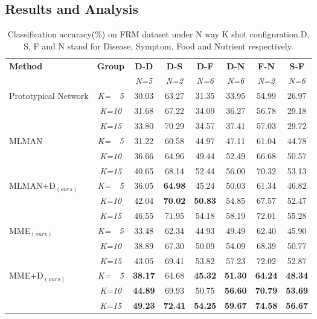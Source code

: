 \subsection{Results and Analysis}
\begin{table*}[ht]
\centering
\small
\begin{tabular}{|l|c|c|c|c|c|c|c|}
\hline
\multirow{2}{*}{\textbf{Method}} & \multirow{2}{*}{\textbf{Group}} & \textbf{D-D} & \textbf{D-S} &\textbf{D-F} & \textbf{D-N} & \textbf{F-N} & \textbf{S-F} \\ 
& & \emph{N=5} & \emph{N=2} & \emph{N=6} & \emph{N=6} & \emph{N=2} & \emph{N=6} \\ \hline
\multirow{3}{*}{Prototypical Network}      & \emph{K=~~5} & 30.03&63.27 &31.35 &33.95 & 54.99& 26.97\\
& \emph{K=10} & 31.68& 67.22&34.09 &36.27 &56.78 &29.18 \\
& \emph{K=15} & 33.80& 70.29&34.57 &37.41 &57.03 &29.72 \\ \hline
\multirow{3}{*}{MLMAN}      & \emph{K=~~5} &31.22 &60.58 &44.97 &47.11 &61.04 &44.78 \\ 
&\emph{K=10} & 36.66&64.96 &49.44 &52.49 &66.68 &50.57 \\
& \emph{K=15} & 40.65&68.14 &52.44 &56.00 &70.32 &53.13 \\ \hline \hline
\multirow{3}{*}{MLMAN+D$_{(ours)}$}      & \emph{K=~~5} &36.05 & \textbf{64.98}& 45.24&50.03 &61.34 & 46.82\\ 
& \emph{K=10} &42.04 & \textbf{70.02}& \textbf{50.83} &54.85 &67.57 &52.47 \\ 
& \emph{K=15} & 46.55& 71.95&54.18 &58.19 &72.01 &55.28 \\  \hline
\multirow{3}{*}{MME$_{(ours)}$}      & \emph{K=~~5} &33.48 &62.34 & 44.93&49.49 &62.40 &45.90 \\ 
& \emph{K=10} &38.89 & 67.30& 50.09& 54.09&68.39 &50.77 \\ 
& \emph{K=15} &43.05 & 69.41&53.82 &57.23 &72.02 & 52.87\\ \hline
\multirow{3}{*}{MME+D$_{(ours)}$}      & \emph{K=~~5} &\textbf{38.17} &64.68 & \textbf{45.32}& \textbf{51.30}& \textbf{64.24}& \textbf{48.34} \\
& \emph{K=10} &\textbf{44.89} &69.93 & 50.75& \textbf{56.60}& \textbf{70.79} &\textbf{53.69} \\ 
& \emph{K=15} &\textbf{49.23} & \textbf{72.41}& \textbf{54.25}& \textbf{59.67}& \textbf{74.58}& \textbf{56.67} \\ \hline
\end{tabular}
\caption{Classification accuracy(\%) on FRM dataset under N way K shot configuration.D, S, F and N stand for Disease, Symptom, Food and Nutrient respectively.}
\label{FRMresult}
\end{table*}

